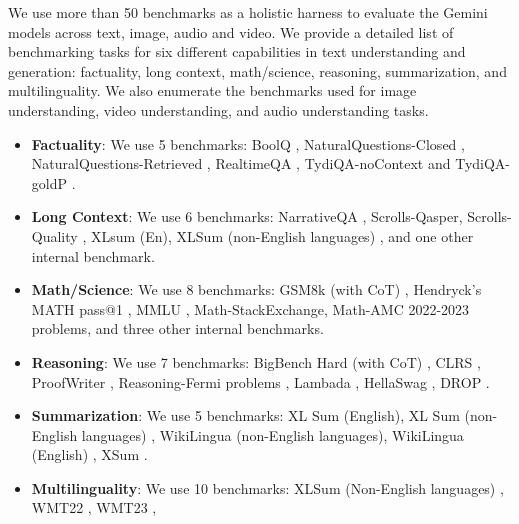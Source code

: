 \label{app:capabilities_tasks}
We use more than 50 benchmarks as a holistic harness to evaluate the Gemini models across text, image, audio and video. We provide a detailed list of benchmarking tasks for six different capabilities in text understanding and generation: factuality, long context, math/science, reasoning, summarization, and multilinguality. We also enumerate the benchmarks used for image understanding, video understanding, and audio understanding tasks.

\begin{itemize}
    \item \textbf{Factuality}: We use 5 benchmarks: 
        BoolQ \cite{clark-etal-2019-boolq}, 
        NaturalQuestions-Closed \cite{kwiatkowski-etal-2019-natural}, NaturalQuestions-Retrieved \cite{kwiatkowski-etal-2019-natural},
        RealtimeQA \cite{kasai2022realtimeqa}, 
        TydiQA-noContext and TydiQA-goldP \cite{tydiqa}.
    \item \textbf{Long Context}: We use 6 benchmarks: 
        NarrativeQA \cite{kocisky-etal-2018-narrativeqa}, 
        Scrolls-Qasper, Scrolls-Quality \cite{shaham-etal-2022-scrolls}, 
        XLsum (En), XLSum (non-English languages) \cite{hasan-etal-2021-xl}, 
        and one other internal benchmark.
    \item \textbf{Math/Science}: We use 8 benchmarks: 
        GSM8k (with CoT) \cite{cobbe2021training}, 
        Hendryck’s MATH pass@1 \cite{hendrycks2021measuring}, 
        MMLU \cite{mmlu}, 
        Math-StackExchange, 
        Math-AMC 2022-2023 problems, 
        and three other internal benchmarks.
    \item \textbf{Reasoning}: We use 7 benchmarks: 
        BigBench Hard (with CoT) \cite{bigbench,suzgun2022challenging}, 
        CLRS \cite{deepmind2022clrs}, 
        ProofWriter \cite{Tafjord2020ProofWriterGI}, 
        Reasoning-Fermi problems \cite{kalyan2021coffee}, 
        Lambada \cite{paperno2016lambada}, 
        HellaSwag \cite{zellers2019hellaswag}, 
        DROP \cite{Dua2019DROP}.
    \item \textbf{Summarization}: We use 5 benchmarks: 
        XL Sum (English), XL Sum (non-English languages) \cite{hasan-etal-2021-xl}, 
        WikiLingua (non-English languages), WikiLingua (English) \cite{ladhak2020wikilingua}, 
        XSum \cite{narayan-etal-2018-dont}.
    \item \textbf{Multilinguality}: We use 10 benchmarks: 
        XLSum (Non-English languages) \cite{hasan-etal-2021-xl}, 
        WMT22 \cite{wmt22}, 
        WMT23 \cite{tom2023findings}, 

\end{itemize}
